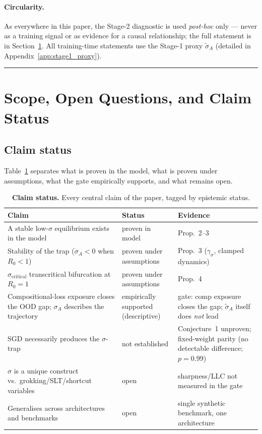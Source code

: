 \documentclass{article}
\theoremstyle{definition}
\begin{document}
\paragraph*{Circularity.}
As everywhere in this paper, the Stage-2 diagnostic is used
\emph{post-hoc} only --- never as a training signal or as evidence for
a causal relationship; the full statement is in
Section~\ref{sec:limitations}. All training-time statements use the
Stage-1 proxy $\tilde{\sigma}_A$ (detailed in Appendix~\ref{app:stage1_proxy}).

\noindent\rule{\linewidth}{0.4pt}

\section{Scope, Open Questions, and Claim Status}\label{sec:limitations}

\subsection{Claim status}\label{sec:claim-status}

Table~\ref{tab:claim-status} separates what is proven in the model,
what is proven under assumptions, what the gate empirically supports,
and what remains open.

\begin{table}[htbp]
\centering
\small
\caption{\textbf{Claim status.} Every central claim of the paper,
tagged by epistemic status.}\label{tab:claim-status}
\begin{tabular}{p{6.2cm} p{3.6cm} p{4.6cm}}
\toprule
\textbf{Claim} & \textbf{Status} & \textbf{Evidence} \\
\midrule
A stable low-$\sigma$ equilibrium exists in the model & proven in model & Prop.~2--3 \\
Stability of the trap ($\dot{\sigma}_A < 0$ when $R_0 < 1$) & proven under assumptions & Prop.~3 ($\gamma_\sigma$, clamped dynamics) \\
$\sigma_{\text{critical}}$ transcritical bifurcation at $R_0 = 1$ & proven under assumptions & Prop.~4 \\
Compositional-loss exposure closes the OOD gap; $\sigma_A$ describes the trajectory & empirically supported (descriptive) & gate: comp exposure closes the gap; $\tilde{\sigma}_A$ itself does \emph{not} lead \\
SGD necessarily produces the $\sigma$-trap & not established & Conjecture~1 unproven; fixed-weight parity (no detectable difference; $p = 0.99$) \\
$\sigma$ is a unique construct vs.\ grokking/SLT/shortcut variables & open & sharpness/LLC not measured in the gate \\
Generalises across architectures and benchmarks & open & single synthetic benchmark, one architecture \\
\bottomrule
\end{tabular}
\end{table}
\end{document}
